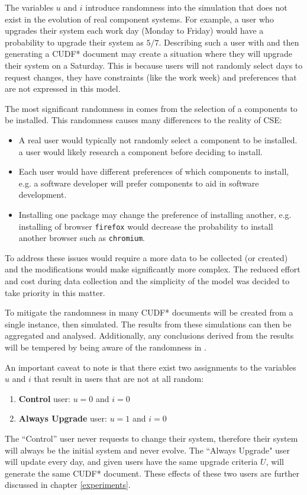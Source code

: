The variables $u$ and $i$ introduce randomness into the simulation that does not exist in the evolution of real component systems.
For example, a user who upgrades their system each work day (Monday to Friday) would have a probability to upgrade their system as $5/7$.
Describing such a user with \usermodel and then generating a CUDF* document may create a situation where they will upgrade their system on a Saturday.
This is because users will not randomly select days to request changes, they have constraints (like the work week) and preferences that are not expressed in this model.

The most significant randomness in \usermodel comes from the selection of a components to be installed.
This randomness causes many differences to the reality of CSE:
\begin{itemize}
  \item A real user would typically not randomly select a component to be installed. a user would likely research a component before deciding to install.
  \item Each user would have different preferences of which components to install, e.g. a software developer will prefer components to aid in software development.
  \item Installing one package may change the preference of installing another, e.g. installing of browser \texttt{firefox} would decrease the probability to install another browser such as \texttt{chromium}.
\end{itemize}
To address these issues would require a more data to be collected (or created) and the modifications would make \usermodel significantly more complex.
The reduced effort and cost during data collection and the simplicity of the model was decided to take priority in this matter.

To mitigate the randomness in \usermodel many CUDF* documents will be created from a single \usermodel instance, then simulated.
The results from these simulations can then be aggregated and analysed.
Additionally, any conclusions derived from the results will be tempered by being aware of the randomness in \usermodel.

An important caveat to note is that there exist two assignments to the variables $u$ and $i$ that result in users that are not at all random:
\begin{enumerate}
  \item \textbf{Control} user: $u = 0$ and $i = 0$
  \item \textbf{Always Upgrade} user: $u = 1$ and $i = 0$
\end{enumerate}
The ``Control'' user never requests to change their system, therefore their system will always be the initial system and never evolve.
The ``Always Upgrade" user will update every day, and given users have the same upgrade criteria $U$, will generate the same CUDF* document.
These effects of these two users are further discussed in chapter \ref{experiments}.

